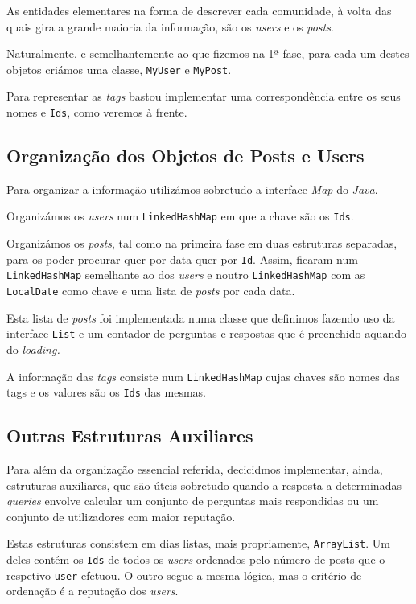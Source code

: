 \documentclass[10pt]{article}
\begin{document}
		As entidades elementares na forma de descrever cada comunidade, 	à volta das quais
	gira a grande maioria da informação, são os \textit{users} e os 			\textit{posts}.
	
		Naturalmente, e semelhantemente ao que fizemos na 1ª fase, 
	para cada um destes objetos criámos uma classe, \texttt{MyUser} 
	e \texttt{MyPost}.
	
		Para representar as \textit{tags} bastou implementar uma 
	correspondência entre os seus nomes e \texttt{Ids}, como veremos 
	à frente.
	

\subsection{Organização dos Objetos de Posts e Users}
		Para organizar a informação utilizámos sobretudo a interface
	\emph{Map} do \textit{Java}.
	
		Organizámos os \textit{users} num \texttt{LinkedHashMap} em 
		que a chave são os \texttt{Ids}.
	
		Organizámos os \textit{posts}, tal como na primeira fase em
	duas estruturas separadas, para os poder procurar quer por data
	quer por \texttt{Id}.  Assim, ficaram num \texttt{LinkedHashMap} 
	semelhante ao dos \textit{users} e noutro \texttt{LinkedHashMap} 
	com as \texttt{LocalDate} como chave e uma lista de \textit{posts} 
	por cada data.
	
		Esta lista de \textit{posts} foi implementada numa classe 
	que definimos fazendo uso da interface \texttt{List} e um contador 
	de perguntas e respostas que é preenchido aquando do 
	\textit{loading.}
	
		A informação das \textit{tags} consiste num 
		\texttt{LinkedHashMap} cujas chaves são nomes das tags e 
		os valores são os \texttt{Ids} das mesmas.
		
	
\subsection{Outras Estruturas Auxiliares}
		
		Para além da organização essencial referida, decicidmos 
	implementar, ainda, estruturas auxiliares, que são úteis sobretudo 
	quando a resposta a determinadas \textit{queries} envolve calcular 
	um conjunto de perguntas mais respondidas ou um conjunto de 
	utilizadores com maior reputação.
	
		Estas estruturas consistem em dias listas, mais propriamente, 
	\texttt{ArrayList}. Um deles contém os \texttt{Ids} de todos os
	\textit{users} ordenados pelo número de posts que o respetivo
	\texttt{user} efetuou. O outro segue a mesma lógica, mas o 
	critério de ordenação é a reputação dos \textit{users}.
	
\end{document}
